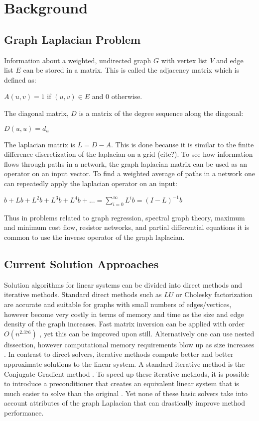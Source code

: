 \documentclass{article}
\begin{document}
\section{Background}
\subsection{Graph Laplacian Problem}
Information about a weighted, undirected graph $G$ with vertex list $V$ and edge list $E$ can be stored in a matrix. This is called the adjacency matrix which is defined as:\\
\begin{center} 
$A(u,v) = 1$ if $(u,v) \in E$ and $0$ otherwise.\\
\end{center}
The diagonal matrix, $D$ is a matrix of the degree sequence along the diagonal:\\
\begin{center}
$D(u,u) = d_u$
\end{center}
The laplacian matrix is $L = D-A$. This is done because it is similar to the finite difference discretization of the laplacian on a grid (cite?). To see how information flows through paths in a network, the graph laplacian matrix can be used as an operator on an input vector. To find a weighted average of paths in a network one can repeatedly apply the laplacian operator on an input:\\
\begin{center}
$b + Lb + L^{2}b + L^{3}b + L^{4}b + ... = \sum_{i = 0}^{\infty} L^{i}b = (I-L)^{-1}b$\\
\end{center}
Thus in problems related to graph regression, spectral graph theory, maximum and minimum cost flow, resistor networks, and partial differential equations it is common to use the inverse operator of the graph laplacian. \cite{Spielman:2010}

\subsection{Current Solution Approaches}
Solution algorithms for linear systems can be divided into direct methods and iterative methods. Standard direct methods such as $LU$ or Cholesky factorization are accurate and suitable for graphs with small numbers of edges/vertices, however become very costly in terms of memory and time as the size and edge density of the graph increases. Fast matrix inversion can be applied with order $O(n^{2.376})$ \cite{Spielman:2010}, yet this can be improved upon still. Alternatively one can use nested dissection, however computational memory requirements blow up as size increases \cite{Khaira:1992}. In contrast to direct solvers, iterative methods compute better and better approximate solutions to the linear system. A standard iterative method is the Conjugate Gradient method \cite{Hestenes:1952}. To speed up these iterative methods, it is possible to introduce a preconditioner that creates an equivalent linear system that is much easier to solve than the original \cite{Saad:2003}. Yet none of these basic solvers take into account attributes of the graph Laplacian that can drastically improve method performance.
\end{document}
